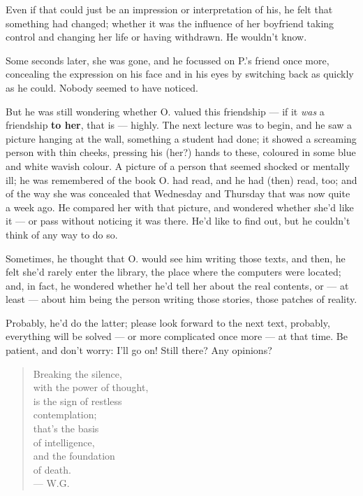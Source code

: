 Even if that could just be an impression or interpretation of his, he felt that something had changed; whether it was the influence of her boyfriend taking control and changing her life or having withdrawn. He wouldn't know.

Some seconds later, she was gone, and he focussed on P.'s friend once more, concealing the expression on his face and in his eyes by switching back as quickly as he could. 
Nobody seemed to have noticed.

But he was still wondering whether O. valued this friendship --- if it \emph{was} a friendship \textbf{to her}, that is --- highly. 
The next lecture was to begin, and he saw a picture hanging at the wall, something a student had done; it showed a screaming person with thin cheeks, pressing his (her?) hands to these, coloured in some blue and white wavish colour. A picture of a person that seemed shocked or mentally ill; he was remembered of the book O. had read, and he had (then) read, too; and of the way she was concealed that Wednesday and Thursday that was now quite a week ago. He compared her with that picture, and wondered whether she'd like it --- or pass without noticing it was there. 
He'd like to find out, but he couldn't think of any way to do so.

Sometimes, he thought that O. would see him writing those texts, and then, he felt she'd rarely enter the library, the place where the computers were located; and, in fact, he wondered whether he'd tell her about the real contents, or --- at least --- about him being the person writing those stories, those patches of reality.

Probably, he'd do the latter; please look forward to the next text, probably, everything will be solved --- or more complicated once more --- at that time. 
Be patient, and don't worry: I'll go on!
Still there? Any opinions?

\begin{quote}
Breaking the silence, \\
with the power of thought, \\
is the sign of restless \\
contemplation; \\
that's the basis \\
of intelligence, \\
and the foundation \\
of death. \\
--- W.G.
\end{quote}

